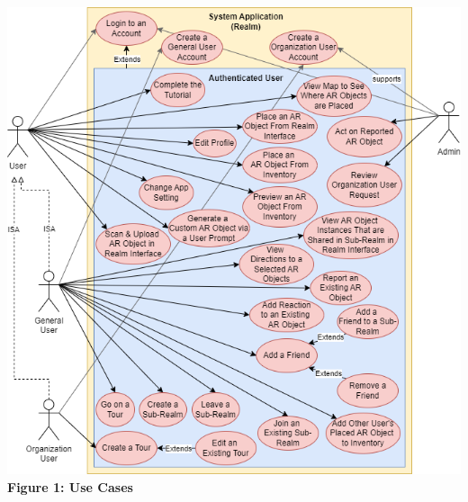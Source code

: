 \documentclass{article}
\begin{document}
\begin{center}
    \includegraphics[scale=0.5]{use_cases.png}\\ 
    \textbf{Figure 1: Use Cases}
\end{center}
\end{document}
